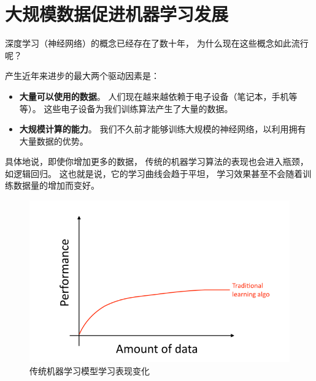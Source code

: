 \chapter{大规模数据促进机器学习发展}

深度学习（神经网络）的概念已经存在了数十年，
为什么现在这些概念如此流行呢？

产生近年来进步的最大两个驱动因素是：
\begin{itemize}
	\item \textbf{大量可以使用的数据}。
	人们现在越来越依赖于电子设备（笔记本，手机等等）。
	这些电子设备为我们训练算法产生了大量的数据。
	\item \textbf{大规模计算的能力}。
	我们不久前才能够训练大规模的神经网络，以利用拥有大量数据的优势。
\end{itemize}

具体地说，即使你增加更多的数据，
传统的机器学习算法的表现也会进入瓶颈，如逻辑回归。
这也就是说，它的学习曲线会趋于平坦，
学习效果甚至不会随着训练数据量的增加而变好。
\begin{figure}[h]
	\centering
	\includegraphics[width=0.5\linewidth]{TeX_files/pic/4.1}
	\caption{传统机器学习模型学习表现变化}
	\label{fig:4.1}
\end{figure}

